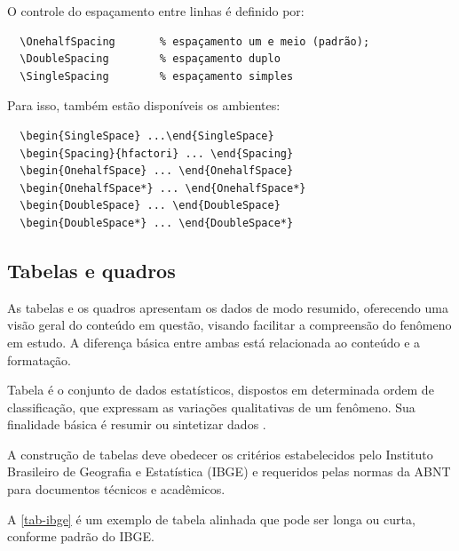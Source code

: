 O controle do espaçamento entre linhas \'e
definido por:
\begin{verbatim}
  \OnehalfSpacing       % espaçamento um e meio (padrão); 
  \DoubleSpacing        % espaçamento duplo
  \SingleSpacing        % espaçamento simples	
\end{verbatim}

Para isso, tamb\'em estão disponíveis os ambientes:
\begin{verbatim}
  \begin{SingleSpace} ...\end{SingleSpace}
  \begin{Spacing}{hfactori} ... \end{Spacing}
  \begin{OnehalfSpace} ... \end{OnehalfSpace}
  \begin{OnehalfSpace*} ... \end{OnehalfSpace*}
  \begin{DoubleSpace} ... \end{DoubleSpace}
  \begin{DoubleSpace*} ... \end{DoubleSpace*} 
\end{verbatim}

\subsection{Tabelas e quadros}

As tabelas e os quadros apresentam os dados de modo resumido, oferecendo uma visão geral do conteúdo em questão, visando facilitar a compreensão do fenômeno em estudo. A diferença b\'asica entre ambas est\'a relacionada ao conteúdo e a formatação. 

Tabela \'e o conjunto de dados estatísticos, dispostos em determinada ordem de classificação, que expressam as variações qualitativas de um fenômeno. Sua finalidade b\'asica \'e resumir ou sintetizar dados \cite{sibi2016}.

A construção de tabelas deve obedecer os crit\'erios estabelecidos pelo Instituto Brasileiro de Geografia e Estatística (IBGE) e requeridos pelas normas da ABNT para documentos t\'ecnicos e acad\^emicos.

A \autoref{tab-ibge} \'e um exemplo de tabela alinhada que pode ser longa ou curta, conforme padrão do IBGE.

